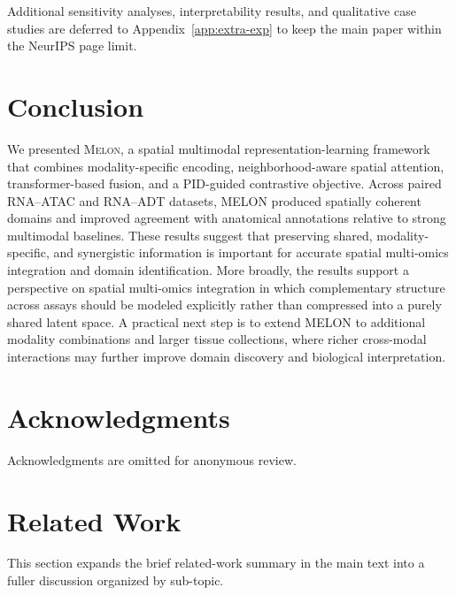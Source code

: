 \documentclass{article}
\theoremstyle{plain}
\theoremstyle{definition}
\newcommand{\melon}{\textsc{Melon}}
\begin{document}
Additional sensitivity analyses, interpretability results, and qualitative case studies are deferred to Appendix~\ref{app:extra-exp} to keep the main paper within the NeurIPS page limit.

\section{Conclusion}
We presented \melon{}, a spatial multimodal representation-learning framework that combines modality-specific encoding, neighborhood-aware spatial attention, transformer-based fusion, and a PID-guided contrastive objective. Across paired RNA--ATAC and RNA--ADT datasets, MELON produced spatially coherent domains and improved agreement with anatomical annotations relative to strong multimodal baselines. These results suggest that preserving shared, modality-specific, and synergistic information is important for accurate spatial multi-omics integration and domain identification. More broadly, the results support a perspective on spatial multi-omics integration in which complementary structure across assays should be modeled explicitly rather than compressed into a purely shared latent space. A practical next step is to extend MELON to additional modality combinations and larger tissue collections, where richer cross-modal interactions may further improve domain discovery and biological interpretation.

\section{Acknowledgments}
Acknowledgments are omitted for anonymous review.




\newpage
\appendix
\onecolumn

\section{Related Work}\label{app:related_work}

This section expands the brief related-work summary in the main text into a fuller discussion organized by sub-topic.
\end{document}
